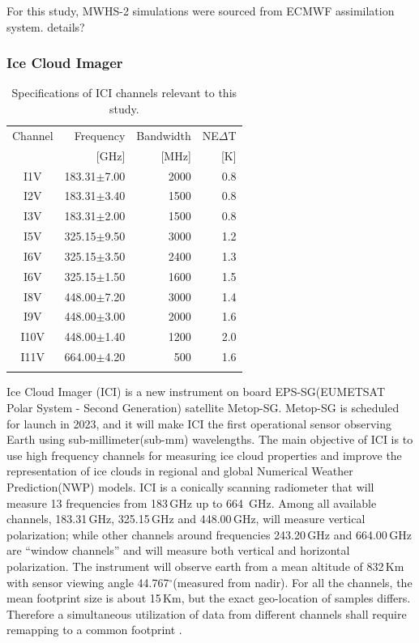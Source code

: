 \documentclass[amt, manuscript]{copernicus}
\newcommand{\todo}[1]{{\color{red} #1}}
\begin{document}
For this study, MWHS-2 simulations were sourced from ECMWF assimilation system. \todo{details?}

\subsubsection{Ice Cloud Imager}
%
\begin{table}[t]	
	\caption{Specifications of ICI channels relevant to this study.}
	\label{tab:ICI_MWI_channels}
	\begin{tabular}{crrr}
		\tophline
		Channel & Frequency 	& Bandwidth  	&NE$\Delta$T	\\
				& [GHz]			& [MHz]			& [K]			\\
		\middlehline
		I1V&	183.31$\pm$7.00    & 2000 			& 0.8 		\\
		I2V&	183.31$\pm$3.40    & 1500 			& 0.8 		\\
		I3V&	183.31$\pm$2.00    & 1500			& 0.8 		\\
		I5V&	325.15$\pm$9.50    & 3000			& 1.2 		\\
		I6V&	325.15$\pm$3.50    & 2400			& 1.3 		\\
		I6V&	325.15$\pm$1.50    & 1600			& 1.5 		\\
		I8V&	448.00$\pm$7.20    & 3000			& 1.4 		\\
		I9V&	448.00$\pm$3.00    & 2000			& 1.6 		\\
		I10V&	448.00$\pm$1.40    & 1200			& 2.0 		\\
		I11V&	664.00$\pm$4.20    & \phantom{0}500	& 1.6 		\\		
		\bottomhline
	\end{tabular}
	\belowtable{} %
\end{table}

Ice Cloud Imager (ICI) is a new instrument on board EPS-SG(EUMETSAT Polar System - Second Generation) satellite Metop-SG. Metop-SG is scheduled for launch in 2023, and it will make ICI the first operational sensor observing Earth using sub-millimeter(sub-mm) wavelengths. The main objective of ICI is to use high frequency channels for measuring ice cloud properties and improve the representation of ice clouds in regional and global Numerical Weather Prediction(NWP) models. ICI is a conically scanning radiometer that will measure 13 frequencies from 183\,GHz up to 664\, GHz.  Among all available channels, 183.31\,GHz, 325.15\,GHz and 448.00\,GHz, will measure vertical polarization;  while other channels around frequencies 243.20\,GHz and 664.00\,GHz are ``window channels'' and will measure both vertical and horizontal polarization. The instrument will observe earth from a mean altitude of 832\,Km with sensor viewing angle 44.767$^\circ$(measured from nadir). For all the channels, the mean footprint size is about 15\,Km, but the exact geo-location of samples differs. Therefore a simultaneous utilization of data from different channels shall require remapping to a common footprint \citep{eriksson:towar:20}.
\end{document}
